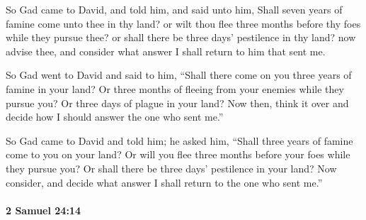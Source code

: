 			\begin{versebox}
					\item[BHS] 
					\item[ASV] So Gad came to David, and told him, and said unto him, Shall seven years of famine come unto thee in thy land? or wilt thou flee three months before thy foes while they pursue thee? or shall there be three days' pestilence in thy land? now advise thee, and consider what answer I shall return to him that sent me.
					\item[NIV] So Gad went to David and said to him, “Shall there come on you three years of famine in your land? Or three months of fleeing from your enemies while they pursue you? Or three days of plague in your land? Now then, think it over and decide how I should answer the one who sent me.”
					\item[NRSV] So Gad came to David and told him; he asked him, “Shall three years of famine come to you on your land? Or will you flee three months before your foes while they pursue you? Or shall there be three days’ pestilence in your land? Now consider, and decide what answer I shall return to the one who sent me.”
			\end{versebox}

		\paragraph{2 Samuel 24:14} %
			\label{2SAMUEL-24-14}

